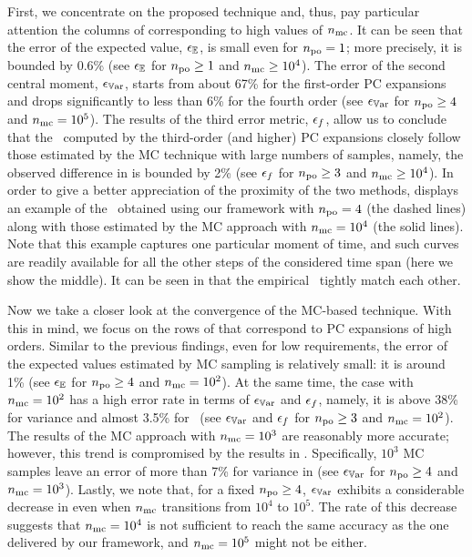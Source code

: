 

First, we concentrate on the proposed technique and, thus, pay particular attention the columns of  corresponding to high values of ${n_\text{mc}}$.
It can be seen that the error of the expected value, $\epsilon_\mathbb{E}$, is small even for ${n_\text{po}} = 1$; more precisely, it is bounded by 0.6\% (see $\epsilon_\mathbb{E}$ for ${n_\text{po}} \geq 1$ and ${n_\text{mc}} \geq 10^4$).
The error of the second central moment, $\epsilon_{\mathbb{V}\text{ar}}$, starts from about 67\% for the first-order PC expansions and drops significantly to less than 6\% for the fourth order (see $\epsilon_{\mathbb{V}\text{ar}}$ for ${n_\text{po}} \geq 4$ and ${n_\text{mc}} = 10^5$).
The results of the third error metric, $\epsilon_f$, allow us to conclude that the \pdfs\ computed by the third-order (and higher) PC expansions closely follow those estimated by the MC technique with large numbers of samples, namely, the observed difference in  is bounded by 2\% (see $\epsilon_f$ for ${n_\text{po}} \geq 3$ and ${n_\text{mc}} \geq 10^4$).
In order to give a better appreciation of the proximity of the two methods,  displays an example of the \pdfs\ obtained using our framework with ${n_\text{po}} = 4$ (the dashed lines) along with those estimated by the MC approach with ${n_\text{mc}} = 10^4$ (the solid lines).
Note that this example captures one particular moment of time, and such curves are readily available for all the other steps of the considered time span (here we show the middle).
It can be seen in  that the empirical \pdfs\ tightly match each other.

Now we take a closer look at the convergence of the MC-based technique.
With this in mind, we focus on the rows of  that correspond to PC expansions of high orders.
Similar to the previous findings, even for low requirements, the error of the expected values estimated by MC sampling is relatively small: it is around 1\% (see $\epsilon_\mathbb{E}$ for ${n_\text{po}} \geq 4$ and ${n_\text{mc}} = 10^2$).
At the same time, the case with ${n_\text{mc}} = 10^2$ has a high error rate in terms of $\epsilon_{\mathbb{V}\text{ar}}$ and $\epsilon_f$, namely, it is above 38\% for variance and almost 3.5\% for \pdfs\ (see $\epsilon_{\mathbb{V}\text{ar}}$ and $\epsilon_f$ for ${n_\text{po}} \geq 3$ and ${n_\text{mc}} = 10^2$).
The results of the MC approach with ${n_\text{mc}} = 10^3$ are reasonably more accurate; however, this trend is compromised by the results in .
Specifically, $10^3$ MC samples leave an error of more than 7\% for variance in  (see $\epsilon_{\mathbb{V}\text{ar}}$ for ${n_\text{po}} \geq 4$ and ${n_\text{mc}} = 10^3$).
Lastly, we note that, for a fixed ${n_\text{po}} \geq 4$, $\epsilon_{\mathbb{V}\text{ar}}$ exhibits a considerable decrease in  even when ${n_\text{mc}}$ transitions from $10^4$ to $10^5$.
The rate of this decrease suggests that ${n_\text{mc}} = 10^4$ is not sufficient to reach the same accuracy as the one delivered by our framework, and ${n_\text{mc}} = 10^5$ might not be either.

